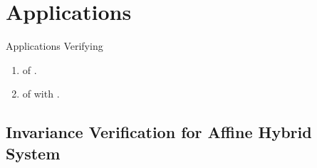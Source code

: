 \section{Applications}

%
\begin{frame}{Applications}
Verifying
\begin{enumerate}
\item {} of .
\item {} of  with .
\end{enumerate}
\end{frame}


\subsection{Invariance Verification for Affine Hybrid System}

